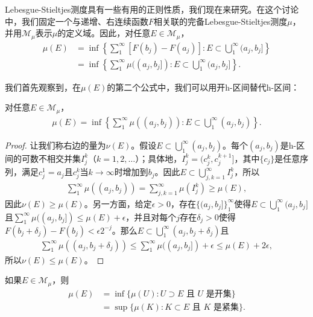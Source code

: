 \documentclass[lang=cn,10pt,thmcnt=section]{elegantbook}
\begin{document}
Lebesgue-Stieltjes测度具有一些有用的正则性质，我们现在来研究。在这个讨论中，我们固定一个与递增、右连续函数$F$相关联的完备Lebesgue-Stieltjes测度$\mu$，并用$\mathcal{M}_{\mu}$表示$\mu$的定义域。因此，对任意$E \in \mathcal{M}_{\mu}$，
\begin{align}
\mu(E) &= \inf\left\{\sum_{1}^{\infty}[F(b_j) - F(a_j)] : E \subset \bigcup_{1}^{\infty}(a_j, b_j]\right\} \\
&= \inf\left\{\sum_{1}^{\infty}\mu((a_j, b_j]) : E \subset \bigcup_{1}^{\infty}(a_j, b_j]\right\}.
\end{align}

我们首先观察到，在$\mu(E)$的第二个公式中，我们可以用开h-区间替代h-区间：

\begin{lemma}\label{lemma1.17}
对任意$E \in \mathcal{M}_{\mu}$，
\begin{align}
\mu(E) = \inf\left\{\sum_{1}^{\infty} \mu((a_j, b_j)) : E \subset \bigcup_{1}^{\infty}(a_j, b_j)\right\}.
\end{align}
\end{lemma}

\begin{proof}
让我们称右边的量为$\nu(E)$。假设$E \subset \bigcup_{1}^{\infty}(a_j, b_j)$。每个$(a_j, b_j)$是h-区间的可数不相交并集$I_j^k$（$k = 1, 2, \ldots$）；具体地，$I_j^k = (c_j^k, c_j^{k+1}]$，其中$\{c_j\}$是任意序列，满足$c_j^1 = a_j$且$c_j^k$当$k \to \infty$时增加到$b_j$。因此$E \subset \bigcup_{j,k=1}^{\infty} I_j^k$，所以
\begin{align}
\sum_{1}^{\infty} \mu((a_j, b_j)) = \sum_{j,k=1}^{\infty} \mu(I_j^k) \geq \mu(E),
\end{align}
因此$\nu(E) \geq \mu(E)$。另一方面，给定$\epsilon > 0$，存在$\{(a_j, b_j]\}_{1}^{\infty}$使得$E \subset \bigcup_{1}^{\infty}(a_j, b_j]$且$\sum_{1}^{\infty} \mu((a_j, b_j]) \leq \mu(E) + \epsilon$，并且对每个$j$存在$\delta_j > 0$使得$F(b_j + \delta_j) - F(b_j) < \epsilon 2^{-j}$。那么$E \subset \bigcup_{1}^{\infty}(a_j, b_j + \delta_j)$且
\begin{align}
\sum_{1}^{\infty}\mu((a_j, b_j + \delta_j)) \leq \sum_{1}^{\infty}\mu((a_j, b_j]) + \epsilon \leq \mu(E) + 2\epsilon,
\end{align}
所以$\nu(E) \leq \mu(E)$。
\end{proof}

\begin{theorem}\label{theorem1.18}
如果$E \in \mathcal{M}_{\mu}$，则
\begin{align}
\mu(E) &= \inf\{\mu(U) : U \supset E \text{ 且 } U \text{ 是开集}\} \\
&= \sup\{\mu(K) : K \subset E \text{ 且 } K \text{ 是紧集}\}.
\end{align}
\end{theorem}
\end{document}

